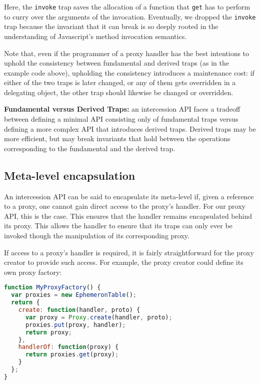 \documentclass{acm_proc_article-sp}
\begin{document}
Here, the \texttt{invoke} trap saves the allocation of a function that \texttt{get} has to perform to curry over the arguments of the invocation. Eventually, we dropped the \texttt{invoke} trap because the invariant that it can break is so deeply rooted in the understanding of Javascript's method invocation semantics.

Note that, even if the programmer of a proxy handler has the best intentions to uphold the consistency between fundamental and derived traps (as in the example code above), upholding the consistency introduces a maintenance cost: if either of the two traps is later changed, or any of them gets overridden in a delegating object, the other trap should likewise be changed or overridden.

\textbf{Fundamental versus Derived Traps:} an intercession API faces a tradeoff between defining a minimal API consisting only of fundamental traps versus defining a more complex API that introduces derived traps. Derived traps may be more efficient, but may break invariants that hold between the operations corresponding to the fundamental and the derived trap.

\subsection{Meta-level encapsulation}
\label{sub:meta_level_encapsulation}

An intercession API can be said to encapsulate its meta-level if, given a reference to a proxy, one cannot gain direct access to the proxy's handler. For our proxy API, this is the case. This ensures that the handler remains encapsulated behind its proxy. This allows the handler to ensure that its traps can only ever be invoked though the manipulation of its corresponding proxy.

If access to a proxy's handler is required, it is fairly straightforward for the proxy creator to provide such access. For example, the proxy creator could define its own proxy factory:

\begin{lstlisting}[language=javascript]
function MyProxyFactory() {
  var proxies = new EphemeronTable();
  return {
    create: function(handler, proto) {
      var proxy = Proxy.create(handler, proto);
      proxies.put(proxy, handler);
      return proxy;
    },
    handlerOf: function(proxy) {
      return proxies.get(proxy);
    }
  };
}
\end{lstlisting}
\end{document}
